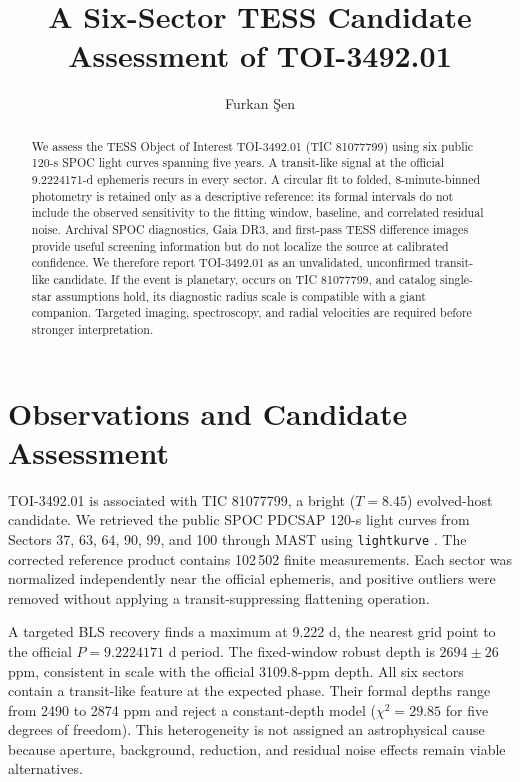 \documentclass[rnaas]{aastex701}
\begin{document}
\title{A Six-Sector TESS Candidate Assessment of TOI-3492.01}

\author{Furkan \c{S}en}

\begin{abstract}
We assess the TESS Object of Interest TOI-3492.01 (TIC 81077799) using six
public 120-s SPOC light curves spanning five years. A transit-like signal at the
official 9.2224171-d ephemeris recurs in every sector. A circular fit to folded,
8-minute-binned photometry is retained only as a descriptive reference: its
formal intervals do not include the observed sensitivity to the fitting window,
baseline, and correlated residual noise. Archival SPOC diagnostics, Gaia DR3,
and first-pass TESS difference images provide useful screening information but
do not localize the source at calibrated confidence. We therefore report
TOI-3492.01 as an unvalidated, unconfirmed transit-like candidate. If the event
is planetary, occurs on TIC 81077799, and catalog single-star assumptions hold,
its diagnostic radius scale is compatible with a giant companion. Targeted
imaging, spectroscopy, and radial velocities are required before stronger
interpretation.
\end{abstract}


\section{Observations and Candidate Assessment}

TOI-3492.01 is associated with TIC 81077799, a bright ($T=8.45$) evolved-host
candidate. We retrieved the public SPOC PDCSAP 120-s light curves from Sectors
37, 63, 64, 90, 99, and 100 through MAST using \texttt{lightkurve}
\citep{Jenkins2016,Lightkurve2018}. The corrected reference product contains
102\,502 finite measurements. Each sector was normalized independently near the
official ephemeris, and positive outliers were removed without applying a
transit-suppressing flattening operation.

A targeted BLS recovery finds a maximum at 9.222 d, the nearest grid point to
the official $P=9.2224171$ d period. The fixed-window robust depth is
$2694\pm26$ ppm, consistent in scale with the official 3109.8-ppm depth. All
six sectors contain a transit-like feature at the expected phase. Their formal
depths range from 2490 to 2874 ppm and reject a constant-depth model
($\chi^2=29.85$ for five degrees of freedom). This heterogeneity is not assigned
an astrophysical cause because aperture, background, reduction, and residual
noise effects remain viable alternatives.
\end{document}
